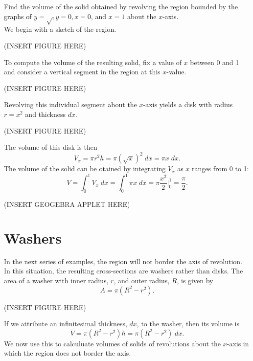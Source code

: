\documentclass{ximera}
\begin{document}
\begin{example} Find the volume of the solid obtained by revolving the region bounded by the graphs of $y=\sqrt, y=0, x=0$, and $x = 1$
about the $x$-axis.\\
We begin with a sketch of the region.

(INSERT FIGURE HERE)

To compute the volume of the resulting solid, fix a value of $x$ between 0 and 1 and consider a vertical segment in the region at this $x$-value.

(INSERT FIGURE HERE)

Revolving this individual segment about the $x$-axis yields a disk with radius $r = x^2$ and thickness $dx$. 

(INSERT FIGURE HERE)

The volume of this disk is then
\[
V_x = \pi r^2 h = \pi (\sqrt x)^2 \; dx = \pi x \; dx.
\]
The volume of the solid can be otained by integrating $V_x$ as $x$ ranges from 0 to 1:
\[
V = \int_0^1 V_x \; dx = \int_0^1 \pi x \; dx = \pi \frac{x^2}{2}\bigg|_0^1 = \frac{\pi}{2}.
\]


(INSERT GEOGEBRA APPLET HERE)

\end{example}



\section{Washers} In the next series of examples, the region will not border the axis of revolution. 
In this situation, the resulting cross-sections are washers rather than disks.
The area of a washer with inner radius, $r$, and outer radius, $R$, is given by 
\[
A = \pi(R^2 - r^2).
\]

(INSERT FIGURE HERE)

If we attribute an infinitesimal thickness, $dx$, to the washer, then its volume is
\[
V = \pi(R^2 - r^2) h = \pi(R^2 - r^2) \; dx.
\]
We now use this to calculuate volumes of solids of revolutions about the $x$-axis in which the region does not border the axis.
\end{document}
